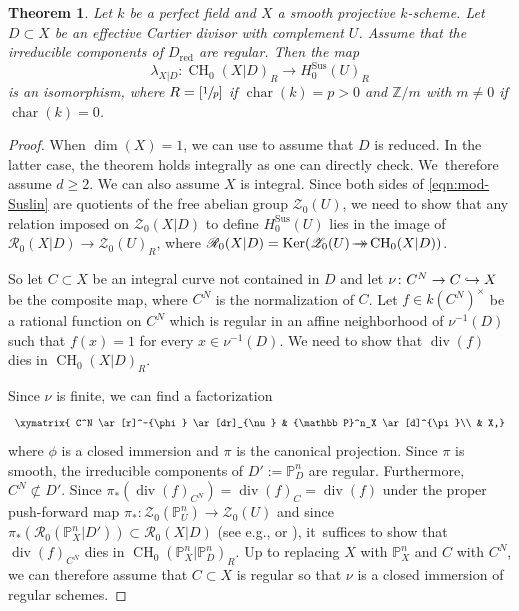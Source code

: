 \documentclass[JEP,XML,SOM,Unicode,published]{cedram}
\let\mathcal\mathscr
\def\hto{\mathrel{\lhook\joinrel\to}}
\newcommand{\onto}{\mathchoice{\to\hspace*{-5mm}\to}{\hspace*{-.5mm}\to\hspace*{-2.85mm}\to\hspace*{-.5mm}}{\to\hspace*{-3mm}\to}{\to\hspace*{-3mm}\to}}
\let\surj\onto
\let\inj\hto
\newcommand{\sus}{\mathrm{Sus}}
\newtheorem{thm}{Theorem}[section]
\theoremstyle{definition}
\newcommand{\sR}{{\mathcal R}}
\newcommand{\sZ}{{\mathcal Z}}
\renewcommand{\P}{{\mathbb P}}
\newcommand{\Z}{{\mathbb Z}}
\DeclareMathOperator{\CH}{CH}
\DeclareMathOperator{\Char}{char}
\DeclareMathOperator{\divf}{div}
\DeclareMathOperator{\Ker}{Ker}
\newcommand{\red}{\mathrm{red}}
\begin{document}
\begin{thm}\label{thm:M1}
Let $k$ be a perfect field and $X$ a smooth projective $k$-scheme.
Let $D \subset X$ be an effective Cartier divisor with complement $U$.
Assume that the irreducible components of $D_\red$ are regular.
Then the map
\[
\lambda_{X|D} \colon \CH_0(X|D)_R \to H^{\sus}_0(U)_R
\]
is an isomorphism, where
$R = [\sfrac{1}{p}]$ if $\Char(k) = p > 0$
and ${\Z}/m$ with $m \neq 0$ if $\Char(k) = 0$.
\end{thm}
\begin{proof}
When $\dim(X) = 1$, we can use \cite[Th.\,1.3(2)]{Miyazaki} to
assume that $D$ is reduced. In the latter case, the theorem holds integrally
as one can directly check. We~therefore assume $d \ge 2$.
We can also assume $X$ is integral.
Since both sides of \eqref{eqn:mod-Suslin} are quotients of the free abelian
group $\sZ_0(U)$, we need to show that
any relation imposed on $\sZ_0(X|D)$ to define $H^{\sus}_0(U)$ lies in the image of
$\sR_0(X|D) \to {\sZ_0(U)}_R$, where $\sR_0(X|D) = \Ker(\sZ_0(U) \surj
\CH_0(X|D))$.

So let $C \subset X$ be an integral curve not contained in $D$ and let
$\nu \colon C^N \to C \inj X$ be the composite map, where $C^N$ is the normalization
of $C$. Let $f \in k(C^N)^{\times}$ be a rational
function on $C^N$ which is regular in an affine neighborhood of $\nu^{-1}(D)$
such that $f(x) = 1$ for every $x \in \nu^{-1}(D)$. We need to show that
$\divf(f)$ dies in ${\CH_0(X|D)}_R$.

Since $\nu$ is finite, we can find a factorization
\begin{equation}\label{eqn:M1-0}
\begin{array}{c}
\xymatrix{
C^N \ar[r]^-{\phi} \ar[dr]_{\nu} & \P^n_X \ar[d]^{\pi}\\
& X,}
\end{array}
\end{equation}
where $\phi$ is a closed immersion and $\pi$ is the canonical projection.
Since $\pi$ is smooth, the irreducible components of
$D' := \P^n_D$ are regular. Furthermore, $C^N \not\subset D'$.
Since $\pi_*(\divf(f)_{C^N}) = \divf(f)_C = \divf(f)$
under the proper push-forward map
$\pi_* \colon \sZ_0(\P^n_U) \to \sZ_0(U)$ and since
$\pi_*(\sR_0(\P^n_X|D')) \subset \sR_0(X|D)$ (see e.g., \cite[\S2]{KPv} or
\cite[Lem.\,2.7]{BS}),
it~suffices to show that
$\divf(f)_{C^N}$ dies in ${\CH_0(\P^n_X|\P^n_D)}_R$.
Up to replacing $X$ with $\P^n_X$ and $C$ with $C^N$, we can therefore assume that
$C \subset X$ is regular so that $\nu$ is a closed immersion of regular
schemes.


\end{proof}
\end{document}
